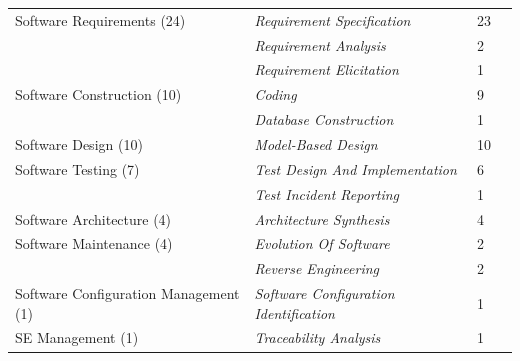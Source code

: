 \begin{tabular} {p{}  p{} p{} p{}}
\midrule  
Software Requirements (24) & \emph{Requirement Specification} & 23 & \cite{ \paperseventeenth,\papereighteenth,\paperthirtyfifth,\paperfortyeighth,\paperfortyninth,\paperfiftieth,\paperfiftyfifth,\paperseventieth,\paperonehundredtwelfth,\paperonehundredtwentysecond,\paperonehundredtwentyfifth,\paperonehundredthirtythird,\paperonehundredfiftythird,\paperonehundredsixtysixth,\paperonehundredseventyfirst,\paperonehundredseventysixth,\paperonehundredseventyeighth,\paperonehundredeightyninth,\papertwohundredfourth,\papertwohundredfifth,\papertwohundredtwelfth,\papertwohundredseventeenth,\papertwohundredtwentyseventh }\\ 
 & \emph{Requirement Analysis} & 2 & \cite{ \paperonehundredeightyninth,\papertwohundredfifth }\\ 
 & \emph{Requirement Elicitation} & 1 & \cite{ \papereightythird }\\ 
\midrule  
Software Construction (10) & \emph{Coding} & 9 & \cite{ \papereighth,\paperfortyseventh,\paperfiftieth,\paperfiftyfifth,\papereightythird,\paperonehundredsecond,\paperonehundredeighteenth,\paperonehundredninetysixth,\papertwohundredthirtyeighth }\\ 
 & \emph{Database Construction} & 1 & \cite{ \paperonehundredseventeenth }\\ 
\midrule  
Software Design (10) & \emph{Model-Based Design} & 10 & \cite{ \paperfourteenth,\paperfortysixth,\paperfiftieth,\paperfiftyfifth,\paperseventyeighth,\papereightythird,\paperonehundredsixtythird,\paperonehundredninetysixth,\papertwohundredfifth,\papertwohundredeighteenth }\\ 
\midrule  
Software Testing (7) & \emph{Test Design And Implementation} & 6 & \cite{ \paperthird,\paperfifteenth,\papereightieth,\papereightyfourth,\paperninetysecond,\papertwohundredthirtyeighth }\\ 
 & \emph{Test Incident Reporting} & 1 & \cite{ \papersixtyfifth }\\ 
\midrule  
Software Architecture (4) & \emph{Architecture Synthesis} & 4 & \cite{ \papertwelfth,\paperthirteenth,\paperonehundredfirst,\paperonehundredfourth }\\ 
\midrule  
Software Maintenance (4) & \emph{Evolution Of Software} & 2 & \cite{ \paperfourteenth,\paperfortyfifth }\\ 
 & \emph{Reverse Engineering} & 2 & \cite{ \paperfourth,\paperonehundredeightyeighth }\\ 
\midrule  
Software Configuration Management (1) & \emph{Software Configuration Identification} & 1 & \cite{ \papereightythird }\\ 
\midrule  
SE Management (1) & \emph{Traceability Analysis} & 1 & \cite{ \paperfourteenth }\\ 
\bottomrule 
\end{tabular} 
